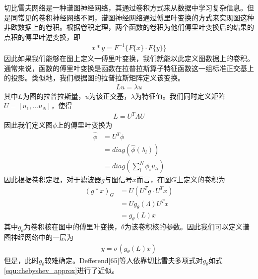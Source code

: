 切比雪夫网络是一种谱图神经网络，其通过卷积方式来从数据中学习复杂信息\cite{proakis_digital_1996}。但是同常见的卷积神经网络不同，谱图神经网络通过傅里叶变换的方式来实现图这种非欧数据上的卷积。根据卷积定理\cite{stahlschmidt_multimodal_2022}，两个函数的卷积为他们傅里叶变换后的结果的点积的傅里叶逆变换，即
\begin{equation}\begin{aligned}
x * y=F^{-1}\{F\{x\}\cdot F\{y\} \}
\end{aligned}\end{equation}
因此如果我们能够在图上定义一傅里叶变换，我们就能以此定义图数据上的卷积。通常来说，函数的傅里叶变换是函数在拉普拉斯算子特征函数这一组标准正交基上的投影。类似地，我们根据图的拉普拉斯矩阵定义该变换。
\begin{equation}\begin{aligned}
Lu=\lambda u
\end{aligned}\end{equation}
其中$L$为图的拉普拉斯量，$u$为该正交基，$\lambda$为特征值。我们同时定义矩阵$U=[u_1,...u_N]$，使得
\begin{equation}\begin{aligned}
L=U^T\Lambda U
\end{aligned}\end{equation}
因此我们定义图$\phi$上的傅里叶变换为
\begin{equation}\begin{aligned}
\hat \phi &=U^T\phi \\
&=diag(\hat \phi(\lambda_l))\\
&=diag(\sum_i^N\phi_iu_{li})
\end{aligned}\end{equation}
因此根据卷积定理，对于滤波器$g$与图信号$x$而言，在图$G$上定义的卷积为
\begin{equation}\begin{aligned}
(g*x)_{G}&=U(U^Tg\cdot U^Tx)\\
&=Ug_\theta(\Lambda) U^Tx\\
&=g_\theta(L)x
\end{aligned}\end{equation}
其中$g_\theta$为卷积核在图中的傅里叶变换，$\theta$为该卷积核的参数。因此我们可以定义谱图神经网络中的一层为
\begin{equation}\begin{aligned}
y=\sigma(g_\theta(L)x)
\end{aligned}\end{equation}
但是，此时$g_\theta$较难确定。Defferend[65]等人依靠切比雪夫多项式对$g_\theta$如式\ref{equ:chebyshev_approx}进行了近似。
